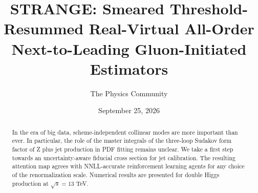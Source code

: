 \documentclass[11pt]{article}
\title{STRANGE: Smeared Threshold-Resummed Real-Virtual All-Order Next-to-Leading Gluon-Initiated Estimators}
\author{The Physics Community}
\date{September 25, 2026}
\numberwithin{equation}{section}
\theoremstyle{definition}
\theoremstyle{remark}
\begin{document}
\maketitle
\begin{abstract}
In the era of big data, scheme-independent collinear modes are more
important than ever. In particular, the role of the master integrals of
the three-loop Sudakov form factor of Z plus jet production in PDF
fitting remains unclear. We take a first step towards an
uncertainty-aware fiducial cross section for jet calibration. The
resulting attention map agrees with NNLL-accurate reinforcement learning
agents for any choice of the renormalization scale. Numerical results
are presented for double Higgs production at $\sqrt{s} = 13$ TeV.
\end{abstract}
\tableofcontents





\nocite{*}


\end{document}
